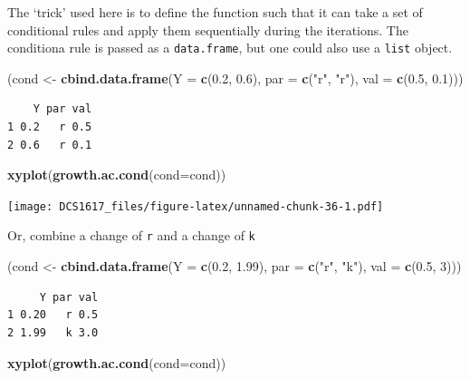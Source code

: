 \documentclass[]{book}
\newenvironment{Shaded}{\begin{snugshade}}{\end{snugshade}}
\newcommand{\KeywordTok}[1]{\textcolor[rgb]{0.13,0.29,0.53}{\textbf{{#1}}}}
\newcommand{\DataTypeTok}[1]{\textcolor[rgb]{0.13,0.29,0.53}{{#1}}}
\newcommand{\DecValTok}[1]{\textcolor[rgb]{0.00,0.00,0.81}{{#1}}}
\newcommand{\FloatTok}[1]{\textcolor[rgb]{0.00,0.00,0.81}{{#1}}}
\newcommand{\StringTok}[1]{\textcolor[rgb]{0.31,0.60,0.02}{{#1}}}
\newcommand{\NormalTok}[1]{{#1}}
\begin{document}
The `trick' used here is to define the function such that it can take a
set of conditional rules and apply them sequentially during the
iterations. The conditiona rule is passed as a \texttt{data.frame}, but
one could also use a \texttt{list} object.

\begin{Shaded}
\begin{Highlighting}[]
\NormalTok{(cond <-}\StringTok{ }\KeywordTok{cbind.data.frame}\NormalTok{(}\DataTypeTok{Y =} \KeywordTok{c}\NormalTok{(}\FloatTok{0.2}\NormalTok{, }\FloatTok{0.6}\NormalTok{), }\DataTypeTok{par =} \KeywordTok{c}\NormalTok{(}\StringTok{"r"}\NormalTok{, }\StringTok{"r"}\NormalTok{), }\DataTypeTok{val =} \KeywordTok{c}\NormalTok{(}\FloatTok{0.5}\NormalTok{, }\FloatTok{0.1}\NormalTok{)))}
\end{Highlighting}
\end{Shaded}

\begin{verbatim}
    Y par val
1 0.2   r 0.5
2 0.6   r 0.1
\end{verbatim}

\begin{Shaded}
\begin{Highlighting}[]
\KeywordTok{xyplot}\NormalTok{(}\KeywordTok{growth.ac.cond}\NormalTok{(}\DataTypeTok{cond=}\NormalTok{cond))}
\end{Highlighting}
\end{Shaded}

\texttt{[image: DCS1617\_files/figure-latex/unnamed-chunk-36-1.pdf]}

Or, combine a change of \texttt{r} and a change of \texttt{k}

\begin{Shaded}
\begin{Highlighting}[]
\NormalTok{(cond <-}\StringTok{ }\KeywordTok{cbind.data.frame}\NormalTok{(}\DataTypeTok{Y =} \KeywordTok{c}\NormalTok{(}\FloatTok{0.2}\NormalTok{, }\FloatTok{1.99}\NormalTok{), }\DataTypeTok{par =} \KeywordTok{c}\NormalTok{(}\StringTok{"r"}\NormalTok{, }\StringTok{"k"}\NormalTok{), }\DataTypeTok{val =} \KeywordTok{c}\NormalTok{(}\FloatTok{0.5}\NormalTok{, }\DecValTok{3}\NormalTok{)))}
\end{Highlighting}
\end{Shaded}

\begin{verbatim}
     Y par val
1 0.20   r 0.5
2 1.99   k 3.0
\end{verbatim}

\begin{Shaded}
\begin{Highlighting}[]
\KeywordTok{xyplot}\NormalTok{(}\KeywordTok{growth.ac.cond}\NormalTok{(}\DataTypeTok{cond=}\NormalTok{cond))}
\end{Highlighting}
\end{Shaded}
\end{document}
